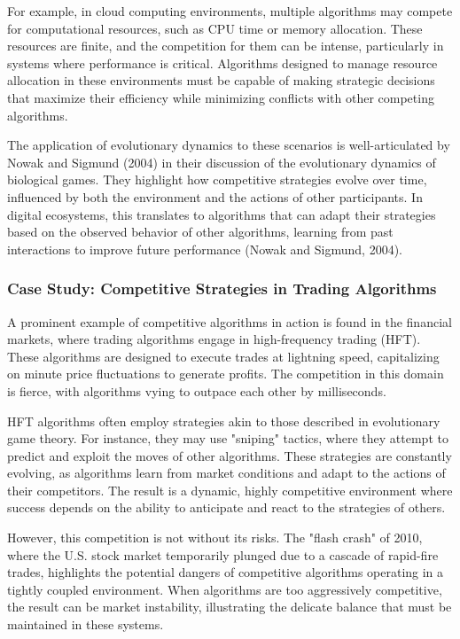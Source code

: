 \documentclass[12pt,twoside]{article}
\begin{document}
For example, in cloud computing environments, multiple algorithms may compete for computational resources, such as CPU time or memory allocation. These resources are finite, and the competition for them can be intense, particularly in systems where performance is critical. Algorithms designed to manage resource allocation in these environments must be capable of making strategic decisions that maximize their efficiency while minimizing conflicts with other competing algorithms.

The application of evolutionary dynamics to these scenarios is well-articulated by Nowak and Sigmund (2004) in their discussion of the evolutionary dynamics of biological games. They highlight how competitive strategies evolve over time, influenced by both the environment and the actions of other participants. In digital ecosystems, this translates to algorithms that can adapt their strategies based on the observed behavior of other algorithms, learning from past interactions to improve future performance (Nowak and Sigmund, 2004).

\subsubsection{Case Study: Competitive Strategies in Trading Algorithms}

A prominent example of competitive algorithms in action is found in the financial markets, where trading algorithms engage in high-frequency trading (HFT). These algorithms are designed to execute trades at lightning speed, capitalizing on minute price fluctuations to generate profits. The competition in this domain is fierce, with algorithms vying to outpace each other by milliseconds.

HFT algorithms often employ strategies akin to those described in evolutionary game theory. For instance, they may use "sniping" tactics, where they attempt to predict and exploit the moves of other algorithms. These strategies are constantly evolving, as algorithms learn from market conditions and adapt to the actions of their competitors. The result is a dynamic, highly competitive environment where success depends on the ability to anticipate and react to the strategies of others.

However, this competition is not without its risks. The "flash crash" of 2010, where the U.S. stock market temporarily plunged due to a cascade of rapid-fire trades, highlights the potential dangers of competitive algorithms operating in a tightly coupled environment. When algorithms are too aggressively competitive, the result can be market instability, illustrating the delicate balance that must be maintained in these systems.
\end{document}

